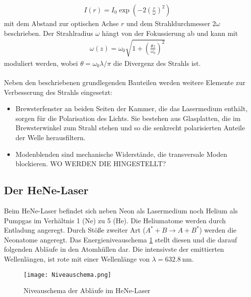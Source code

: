 \begin{align}
	I(r) = I_0\exp\left(-2\left(\frac{r}{\omega}\right)^2\right)
\end{align}
mit dem Abstand zur optischen Achse $r$ und dem Strahldurchmesser $2\omega$ beschrieben. Der Strahlradius $\omega$ hängt von der Fokussierung ab und kann mit
\begin{align}
	\omega(z) = \omega_0\sqrt{1+\left(\frac{\theta z}{\omega_0}\right)^2}
\end{align}
moduliert werden, wobei $\theta = \omega_0\lambda\slash\pi$ die Divergenz des Strahls ist. \\
\ \\
Neben den beschriebenen grundlegenden Bauteilen werden weitere Elemente zur Verbesserung des Strahls eingesetzt:
\begin{itemize}
	\item Brewsterfenster an beiden Seiten der Kammer, die das Lasermedium enthält, sorgen für die Polarisation des Lichts. Sie bestehen aus Glasplatten, die im Brewsterwinkel zum Strahl stehen und so die senkrecht polarisierten Anteile der Welle herausfiltern.
	\item Modenblenden sind mechanische Widerstände, die transversale Moden blockieren. WO WERDEN DIE HINGESTELLT?
\end{itemize}
\subsection{Der HeNe-Laser}
Beim HeNe-Laser befindet sich neben Neon als Lasermedium noch Helium als Pumpgas im Verhältnis 1 (Ne) zu 5 (He). Die Heliumatome werden durch Entladung angeregt. Durch Stöße zweiter Art ($A^* + B \rightarrow A + B^*$) werden die Neonatome angeregt. Das Energieniveauschema \ref{fig:Niveaus} stellt diesen und die darauf folgenden Abläufe in den Atomhüllen dar. Die intensivste der emittierten Wellenlängen, ist rote mit einer Wellenlänge von $\lambda = \SI{632.8}{\nano\metre}$.
\begin{figure}[h!]
	\centering
	\texttt{[image: Niveauschema.png]}
	\caption{Niveauschema der Abläufe im HeNe-Laser \cite{Niveaus}}
	\label{fig:Niveaus}
\end{figure}